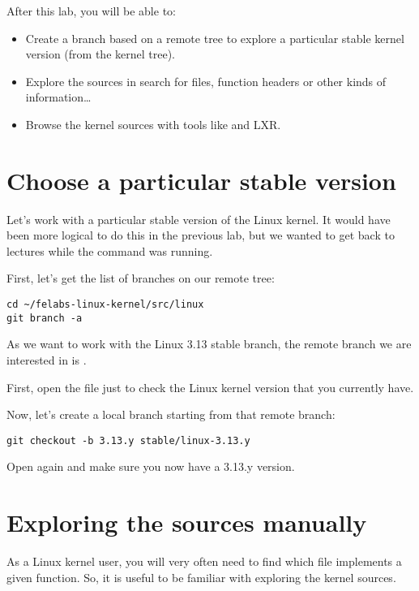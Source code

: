 
After this lab, you will be able to:

\begin{itemize}

\item Create a branch based on a remote tree to explore a particular
      stable kernel version (from the  kernel tree).
\item Explore the sources in search for files, function headers or
  other kinds of information\ldots
\item Browse the kernel sources with tools like  and LXR.
\end{itemize}

\section{Choose a particular stable version}

Let's work with a particular stable version of the Linux kernel.
It would have been more logical to do this in the previous lab, but we
wanted to get back to lectures while the  command was
running.

First, let's get the list of branches on our  remote tree:

\begin{verbatim}
cd ~/felabs-linux-kernel/src/linux
git branch -a
\end{verbatim}

As we want to work with the Linux 3.13 stable branch, the remote branch
we are interested in is .

First, open the  file just to check the Linux kernel
version that you currently have.

Now, let's create a local branch starting from that remote branch:
\begin{verbatim}
git checkout -b 3.13.y stable/linux-3.13.y
\end{verbatim}

Open  again and make sure you now have a 3.13.y version.

\section{Exploring the sources manually}

As a Linux kernel user, you will very often need to find which file
implements a given function. So, it is useful to be familiar with
exploring the kernel sources.

